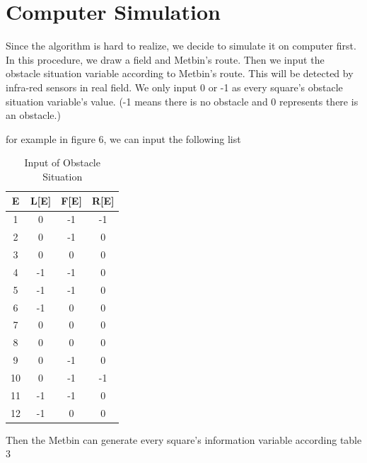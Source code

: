 \documentclass[12pt]{article}
\begin{document}
\section{Computer Simulation}
Since the algorithm is hard to realize, we decide to simulate it on computer first. In this procedure, we draw a field and Metbin's route. Then we input the obstacle situation variable according to Metbin's route. This will be detected by infra-red sensors in real field. We only input 0 or -1 as every square's obstacle situation variable's value. (-1 means there is no obstacle and 0 represents there is an obstacle.)
\par for example in figure 6, we can input the following list
\begin{table}[H]
\centering
\begin{tabular}{|c|c|c|c|}
\hline
\textbf{E}  & \textbf{L[E]} & \textbf{F[E]} & \textbf{R[E]} \\ \hline
1  & 0        & -1       & -1       \\ \hline
2  & 0        & -1       & 0        \\ \hline
3  & 0        & 0        & 0        \\ \hline
4  & -1       & -1       & 0        \\ \hline
5  & -1       & -1       & 0        \\ \hline
6  & -1       & 0        & 0        \\ \hline
7  & 0        & 0        & 0        \\ \hline
8  & 0        & 0        & 0        \\ \hline
9  & 0        & -1       & 0        \\ \hline
10 & 0        & -1       & -1       \\ \hline
11 & -1       & -1       & 0        \\ \hline
12 & -1       & 0        & 0        \\ \hline
\end{tabular}
\caption{Input of Obstacle Situation}
\end{table}
Then the Metbin can generate every square's information variable according table 3
\end{document}
